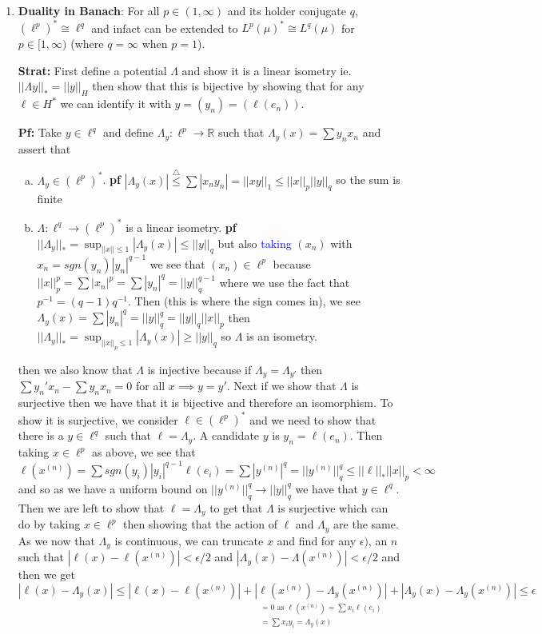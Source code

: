 \documentclass{article}
\begin{document}
\begin{enumerate}
    \item \textbf{Duality in Banach}: For all \(p \in (1, \infty)\) and its holder conjugate \(q\), \((\ell^p)^* \cong \ell^q\) and infact can be extended to \(L^p(\mu)^* \cong L^q(\mu)\) for \(p \in [1,\infty)\) (where \(q = \infty\) when \(p=1\)).

    \textbf{Strat:} First define a potential \(\Lambda\) and show it is a linear isometry ie. \(||\Lambda y||_* = ||y||_H\) then show that this is bijective by showing that for any \(\ell \in H^*\) we can identify it with \(y  = (y_n) = (\ell(e_n))\).
    
    \textbf{Pf:} Take \(y \in \ell^q\) and define \(\Lambda_y  :\ell^p \to \mathbb{R}\) such that \(\Lambda_y(x) = \sum y_nx_n\) and assert that
    \begin{enumerate} [a.]
        \item \(\Lambda_y \in (\ell^p)^*\). \textbf{pf} \(|\Lambda_y(x)| \overset{\triangle}{\leq} \sum |x_ny_n| = ||xy||_1 \leq ||x||_p||y||_q \) so the sum is finite
        \item \(\Lambda:\ell^q \to (\ell^p)^*\) is a linear isometry. \textbf{pf} \(||\Lambda_y||_* = \sup_{||x||\leq 1}|\Lambda_y(x)| \leq ||y||_q\) but also \textcolor{blue}{taking} \((x_n)\) with \(x_n = sgn(y_n)|y_n|^{q-1}\) we see that \((x_n) \in \ell^p\) because \(||x||^p_p = \sum |x_n|^p = \sum |y_n|^q = ||y||_q^{q-1}\) where we use the fact that \(p^{-1} = (q-1)q^{-1}\). Then (this is where the sign comes in), we see \(\Lambda_y(x) = \sum |y_n|^q = ||y||_q^q = ||y||_q ||x||_p\) then \(||\Lambda_y||_* =\sup_{||x||_p \leq1} |\Lambda_y(x)|\geq ||y||_q\) so \(\Lambda\) is an isometry.
    \end{enumerate}
    then we also know that \(\Lambda\) is injective because if \(\Lambda_y = \Lambda_{y'}\) then \(\sum y_n' x_n - \sum y_n x_n = 0\) for all \(x \implies y = y'\). Next if we show that \(\Lambda\) is surjective then we have that it is bijective and therefore an isomorphism. To show it is surjective, we consider \(\ell \in (\ell^p)^*\) and we need to show that there is a \(y \in \ell^q\) such that \(\ell = \Lambda_y\). A candidate \(y\) is \(y_n = \ell(e_n)\). Then taking \(x \in \ell^p\) as above, we see that \(\ell(x^{(n)} ) = \sum sgn(y_i)|y_i|^{q-1}\ell(e_i) = \sum|y^{(n)}|^q = ||y^{(n)}||^q_q \leq ||\ell||_*||x||_p<\infty\) and so as we have a uniform bound on \(||y^{(n)}||^q_q \to ||y||^q_q\) we have that \(y \in \ell^q \). Then we are left to show that \(\ell = \Lambda_y\) to get that \(\Lambda\) is surjective which can do by taking \(x \in \ell^p\) then showing that the action of \(\ell\) and \(\Lambda_y\) are the same. As we now that \(\Lambda_y\) is continuous, we can truncate \(x\) and find for any \(\epsilon)\), an \(n\) such that \(|\ell(x) - \ell(x^{(n)})| < \epsilon/2\) and \(|\Lambda_y(x) - \Lambda(x^{(n)})| < \epsilon/2\) and then we get 
    \[
    |\ell(x) - \Lambda_y(x)| \leq 
    |\ell(x) - \ell(x^{(n)})| + 
    \underset{
      \substack{
        = 0 \text{ as } \ell(x^{(n)}) = \sum x_i \ell(e_i) \\ 
        = \sum x_i y_i = \Lambda_y(x)
      }
    }{|\ell(x^{(n)}) - \Lambda_y(x^{(n)})|} 
    + |\Lambda_y(x) - \Lambda_y(x^{(n)})| 
    \boldsymbol{\leq} \epsilon
    \]


\end{enumerate}
\end{document}
